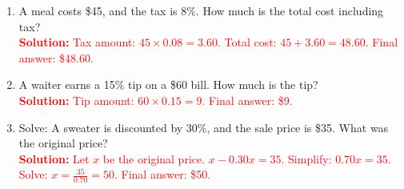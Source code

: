 \documentclass[10pt]{article}
\begin{document}
\begin{tcolorbox}[colframe=black!60, colback=white, 
coltitle=black, colbacktitle=black!15, fonttitle=\bfseries\Large, 
title=Exercises, halign title=center, left=10pt, right=10pt, top=10pt, bottom=20pt]
\begin{enumerate}[itemsep=2em]
    \item A meal costs \$45, and the tax is 8\%. How much is the total cost including tax?\\
    \textcolor{red}{\textbf{Solution:} Tax amount: \(45 \times 0.08 = 3.60\). Total cost: \(45 + 3.60 = 48.60\). Final answer: \$48.60.}

    \item A waiter earns a 15\% tip on a \$60 bill. How much is the tip?\\
    \textcolor{red}{\textbf{Solution:} Tip amount: \(60 \times 0.15 = 9\). Final answer: \$9.}

    \item Solve: A sweater is discounted by 30\%, and the sale price is \$35. What was the original price?\\
    \textcolor{red}{\textbf{Solution:} Let \(x\) be the original price. \(x - 0.30x = 35\). Simplify: \(0.70x = 35\). Solve: \(x = \frac{35}{0.70} = 50\). Final answer: \$50.}
\end{enumerate}
\end{tcolorbox}
\end{document}
